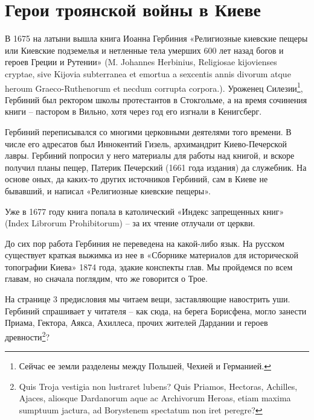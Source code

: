 \chapter{Герои троянской войны в Киеве}

В 1675 на латыни вышла книга Иоанна Гербиния  «Религиозные киевские пещеры или Киевские подземелья и нетленные тела умерших 600 лет назад богов и героев Греции и Рутении» (M. Johannes Herbinius, Religiosae kijovienses cryptae, sive Kijovia subterranea et emortua a sexcentis annis divorum atque heroum Graeco-Ruthenorum et necdum corrupta corpora.). Уроженец Силезии\footnote{Сейчас ее земли разделены между Польшей, Чехией и Германией.}, Гербиний был ректором школы протестантов в Стокгольме, а на время сочинения книги – пастором в Вильно, хотя через год его изгнали в Кенигсберг. 

Гербиний переписывался со многими церковными деятелями того времени. В числе его адресатов был Иннокентий Гизель, архимандрит Киево-Печерской лавры. Гербиний попросил у него материалы для работы над книгой, и вскоре получил планы пещер, Патерик Печерский (1661 года издания) да служебник. На основе оных, да каких-то других источников Гербиний, сам в Киеве не бывавший, и написал «Религиозные киевские пещеры».

Уже в 1677 году книга попала в католический «Индекс запрещенных книг» (Index Librorum Prohibitorum) – за их чтение отлучали от церкви.

До сих пор работа Гербиния не переведена на какой-либо язык. На русском существует краткая выжимка из нее в «Сборнике материалов для исторической топографии Киева» 1874 года, эдакие конспекты глав. Мы пройдемся по всем главам, но сначала поглядим, что же говорится о Трое.

На странице 3 предисловия мы читаем вещи, заставляющие навострить уши. Гербиний спрашивает у читателя – как сюда, на берега Борисфена, могло занести Приама, Гектора, Аякса, Ахиллеса, прочих жителей Дардании и героев древности\footnote{Quis Troja vestigia non lustraret lubens? Quis Priamos, Hectoras, Achilles, Ajaces, aliosque Dardanorum aque ac Archivorum Heroas, etiam maxima sumptuum jactura, ad Borystenem spectatum non iret peregre?}?

